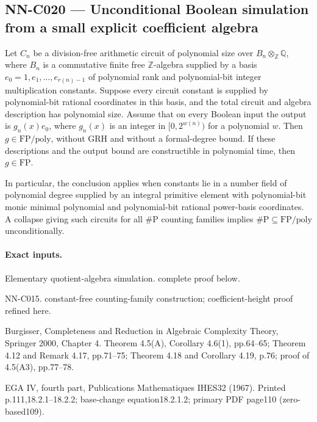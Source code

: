 \subsection{NN-C020 --- Unconditional Boolean simulation from a small explicit coefficient algebra}
\begin{proposition}[NN-C020]
Let $C_n$ be a division-free arithmetic circuit of polynomial size over $B_n\otimes_{\mathbb Z}\mathbb Q$, where $B_n$ is a commutative finite free $\mathbb Z$-algebra supplied by a basis $e_0=1,e_1,\ldots,e_{r(n)-1}$ of polynomial rank and polynomial-bit integer multiplication constants. Suppose every circuit constant is supplied by polynomial-bit rational coordinates in this basis, and the total circuit and algebra description has polynomial size. Assume that on every Boolean input the output is $g_n(x)e_0$, where $g_n(x)$ is an integer in $[0,2^{w(n)})$ for a polynomial $w$. Then $g\in\mathrm{FP}/\mathrm{poly}$, without GRH and without a formal-degree bound. If these descriptions and the output bound are constructible in polynomial time, then $g\in\mathrm{FP}$.

In particular, the conclusion applies when constants lie in a number field of polynomial degree supplied by an integral primitive element with polynomial-bit monic minimal polynomial and polynomial-bit rational power-basis coordinates. A collapse giving such circuits for all $\#\mathrm P$ counting families implies $\#\mathrm P\subseteq\mathrm{FP}/\mathrm{poly}$ unconditionally.
\end{proposition}
\paragraph{Exact inputs.}
Elementary quotient-algebra simulation. complete proof below.

NN-C015. constant-free counting-family construction; coefficient-height proof refined here.

Burgisser, Completeness and Reduction in Algebraic Complexity Theory, Springer 2000, Chapter 4. Theorem 4.5(A), Corollary 4.6(1), pp.64--65; Theorem 4.12 and Remark 4.17, pp.71--75; Theorem 4.18 and Corollary 4.19, p.76; proof of 4.5(A3), pp.77--78.

EGA IV, fourth part, Publications Mathematiques IHES32 (1967). Printed p.111,18.2.1--18.2.2; base-change equation18.2.1.2; primary PDF page110 (zero-based109).

